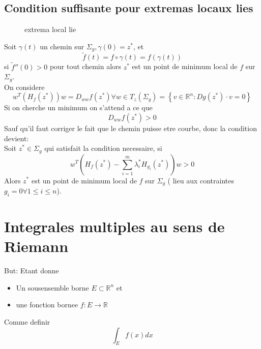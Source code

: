 \documentclass[../main.tex]{subfiles}
\begin{document}
\subsection{Condition suffisante pour extremas locaux lies}
\begin{figure}[H]
    \centering
    \caption{extrema local lie}
    \label{fig:extrema-local-lie}
\end{figure}
Soit $\gamma( t) $ un chemin sur $\Sigma_g, \gamma( 0)=z^{*} $, et
\[ 
	\tilde f( t) = f \circ \gamma( t) = f(  \gamma( t) ) 
\]
si $\tilde f '' ( 0) >0$ pour tout chemin alors $z^{*}$ est un point de minimum local de $f$ sur $\Sigma_g$.\\
On considere
\[ 
	w^{T} (  H_f ( z^{*}) ) w = D_{ww}  f( z^{*})  \forall w \in T_z( \Sigma_g) = \left\{ v \in \mathbb{R}^n: Dg( z^{*}) \cdot v =0 \right\} 
\]
Si on cherche un minimum on s'attend a ce que
\[ 
D_{ww}  f( z^{*}) >0
\]
Sauf qu'il faut corriger le fait que le chemin puisse etre courbe, donc la condition devient:\\
Soit $z^{*}\in \Sigma_g$ qui satisfait la condition necessaire, si
\[ 
	w^{T} (  H_f ( z^{*}) - \sum_{i=1}^{ m} \lambda_i^{*}H_{g_i} ( z^{*})  ) w >0
\]
Alors $z^{*}$ est un point de minimum local de $f$ sur $\Sigma_g$ ( lieu aux contraintes $g_i =0 \forall 1 \leq  i \leq n$).
\section{Integrales multiples au sens de Riemann}
But: Etant donne
\begin{itemize}
\item Un sousensemble borne $E \subset \mathbb{R}^n$ et
\item une fonction bornee $f: E \to \mathbb{R}$
\end{itemize}
Comme definir
\[ 
	\int_E f( x) dx
\]
\end{document}
